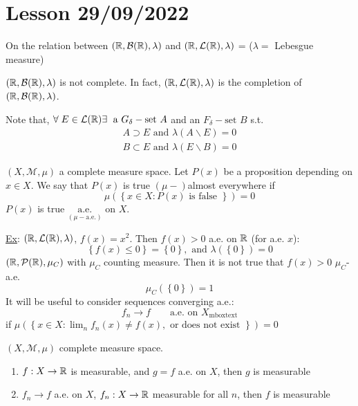 \section{Lesson 29/09/2022}
\begin{remark}
    On the relation between \((\mathbb{R}, \mathcal{B}(\mathbb{R}), \lambda)\) and  \((\mathbb{R}, \mathcal{L}(\mathbb{R}), \lambda)\) = (\(\lambda =\) Lebesgue measure)

    \((\mathbb{R}, \mathcal{B}(\mathbb{R}), \lambda)\) is not complete. In fact, \((\mathbb{R}, \mathcal{L}(\mathbb{R}), \lambda)\) is the completion of \((\mathbb{R}, \mathcal{B}(\mathbb{R}), \lambda)\).

    Note that, \(\forall \; E \in \mathcal{L}(\mathbb{R}) \exists \; \mbox{ a } G_{\delta}-\mbox{set } A\) and an \(F_{\delta}-\mbox{set } B\) s.t.
    \[
        \begin{array}{l}
            A \supset E \mbox{ and } \lambda(A \backslash E) = 0 \\
            B \subset E \mbox{ and } \lambda(E \backslash B) = 0
        \end{array}
    \]
\end{remark}
\((X, \mathcal{M}, \mu)\) a complete measure space. Let \(P(x)\) be a proposition depending on \(x \in X\). We say that \(P(x)\) is true \((\mu-)\)almost everywhere if 
\[
    \mu\left(\left\{ x \in X : P(x) \mbox{ is false }\right\}\right) = 0
\]
\(P(x)\) is true \(\underset{(\mu-\text{a.e.})}{\mbox{a.e.}}\) on \(X\).

\underline{Ex}: \((\mathbb{R}, \mathcal{L}(\mathbb{R}), \lambda)\), \(f(x) = x^2\).  
Then \(f(x) > 0\) a.e. on \(\mathbb{R}\) (for a.e. \(x\)):
\[
    \left\{ f(x) \leq 0 \right\} = \left\{ 0 \right\}, \mbox{ and } \lambda(\left\{ 0 \right\}) = 0
\]
\((\mathbb{R}, \mathcal{P}(\mathbb{R}), \mu_C)\) with \(\mu_C\) counting measure. Then it is not true that \(f(x) > 0\) \(\mu_C\)-a.e. 
\[
    \mu_C \left(\left\{ 0 \right\}\right) = 1
\]
It will be useful to consider sequences converging a.e.: 
\[
    f_n \to f \qquad \mbox{a.e. on }X_{\mbox{mbox} \text{text}}
\]
if \(\mu\left( \left\{ x \in X : \lim_n f_n(x) \neq f(x), \mbox{ or does not exist } \right\}\right) = 0\)
\begin{proposition}
    \((X, \mathcal{M}, \mu)\) complete measure space. 
    \begin{enumerate}
        \item \(f: X \to \mathbb{R}\) is measurable, and \(g = f \) a.e. on \(X\), then \(g\) is measurable
        \item \(f_n \to f\) a.e. on \(X\), \(f_n : X \to \mathbb{R}\) measurable for all \(n\), then \(f\) is measurable
    \end{enumerate}
\end{proposition}
